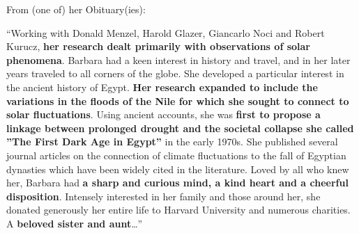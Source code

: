 \documentclass[
  letterpaper,
  DIV=11,
  numbers=noendperiod]{scrartcl}
\begin{document}
From (one of) her Obituary(ies):

``Working with Donald Menzel, Harold Glazer, Giancarlo Noci and Robert
Kurucz, \textbf{her research dealt primarily with observations of solar
phenomena}. Barbara had a keen interest in history and travel, and in
her later years traveled to all corners of the globe. She developed a
particular interest in the ancient history of Egypt. \textbf{Her
research expanded to include the variations in the floods of the Nile
for which she sought to connect to solar fluctuations}. Using ancient
accounts, she was \textbf{first to propose a linkage between prolonged
drought and the societal collapse she called ''The First Dark Age in
Egypt''} in the early 1970s. She published several journal articles on
the connection of climate fluctuations to the fall of Egyptian dynasties
which have been widely cited in the literature. Loved by all who knew
her, Barbara had \textbf{a sharp and curious mind, a kind heart and a
cheerful disposition}. Intensely interested in her family and those
around her, she donated generously her entire life to Harvard University
and numerous charities. A \textbf{beloved sister and aunt}\ldots{}''
\end{document}
